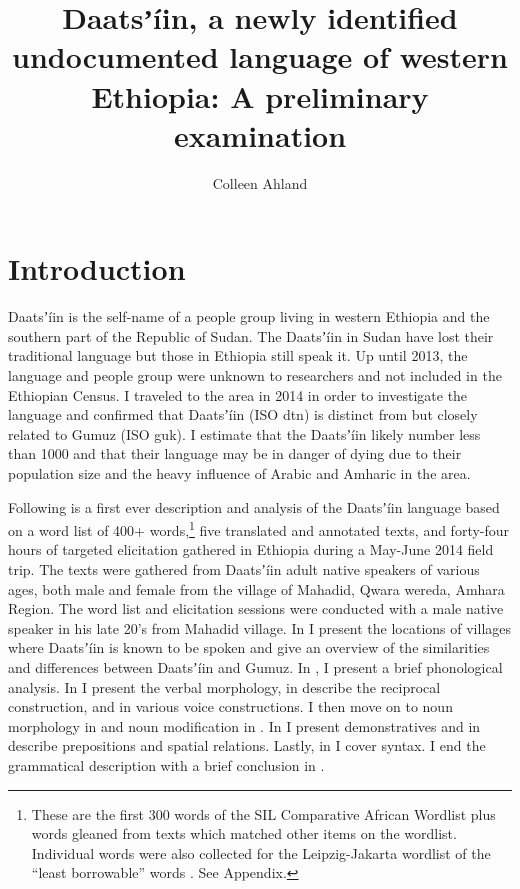 \documentclass[output=paper]{langsci/langscibook}
\title{Daatsʼíin, a newly identified undocumented language of western Ethiopia: A preliminary examination}
\author{%
 Colleen Ahland \affiliation{SIL International} 
}
\begin{document}

\section{Introduction}\label{sec:ahlandc:1}

Daatsʼ\'{i}in is the self-name of a people group living in western Ethiopia and the southern part of the Republic of Sudan. The Daatsʼ\'{i}in in Sudan have lost their traditional language but those in Ethiopia still speak it. Up until 2013, the language and people group were unknown to researchers and not included in the Ethiopian Census. I traveled to the area in 2014 in order to investigate the language and confirmed that Daatsʼ\'{i}in (ISO dtn) is distinct from but closely related to Gumuz (ISO guk). I estimate that the Daatsʼ\'{i}in likely number less than 1000 and that their language may be in danger of dying due to their population size and the heavy influence of Arabic and Amharic in the area.

Following is a first ever description and analysis of the Daatsʼ\'{i}in language based on a word list of 400+ words,\footnote{These are the first 300 words of the SIL Comparative African Wordlist \citep{SniderRoberts2006} plus words gleaned from texts which matched other items on the wordlist. Individual words were also collected for the Leipzig-Jakarta wordlist of the “least borrowable” words \citep{HaspelmathTadmor2009}. See Appendix.} five translated and annotated texts, and forty-four hours of targeted elicitation gathered in Ethiopia during a May-June 2014 field trip. The texts were gathered from Daatsʼ\'{i}in adult native speakers of various ages, both male and female from the village of Mahadid, Qwara wereda, Amhara Region. The word list and elicitation sessions were conducted with a male native speaker in his late 20’s from Mahadid village. In  I present the locations of villages where Daatsʼ\'{i}in is known to be spoken and give an overview of the similarities and differences between Daatsʼ\'{i}in and Gumuz. In , I present a brief phonological analysis. In  I present the verbal morphology, in  describe the reciprocal construction, and in  various voice constructions. I then move on to noun morphology in  and noun modification in . In  I present demonstratives and in  describe prepositions and spatial relations. Lastly, in  I cover syntax. I end the grammatical description with a brief conclusion in .
\end{document}
